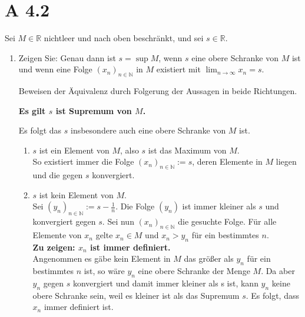 \documentclass[11pt]{article}
\begin{document}
    \section*{A 4.2}
    Sei \(M \in \mathbb{R}\) nichtleer und nach oben beschränkt, und sei \(s \in \mathbb{R}\).
    \begin{enumerate}[ label= (\alph*) ]
        \item Zeigen Sie: Genau dann ist \(s = \sup M\), wenn \(s\) eine obere Schranke von \(M\) ist
        und wenn eine Folge \({(x_n)}_{n \in \mathbb{N}}\) in \(M\) existiert mit \( \lim_{n \to \infty} x_n = s\).

        Beweisen der Äquivalenz durch Folgerung der Aussagen in beide Richtungen.
        \begin{center}
            \textbf{Es gilt \(s\) ist Supremum von \(M\).}
        \end{center}
        Es folgt das \(s\) insbesondere auch eine obere Schranke von \(M\) ist.
        \begin{enumerate}[ label = \arabic*. Fall ]
            \item \(s\) ist ein Element von \(M\), also \(s\) ist das Maximum von \(M\). \\
            So existiert immer die Folge \( {(x_n)}_{n \in \mathbb{N}} := s \), deren Elemente in \(M\) liegen und die gegen \(s\) konvergiert.

            \item \(s\) ist kein Element von \(M\). \\
            Sei \( {(y_n)}_{n \in \mathbb{N}} := s - \frac{1}{n} \). Die Folge \( (y_n) \) ist immer kleiner als \(s\) und konvergiert gegen \(s\).
            Sei nun \( {(x_n)}_{n \in \mathbb{N}} \) die gesuchte Folge. Für alle Elemente von \(x_n\) gelte \(x_n \in M \) und \(x_n > y_n\) für ein bestimmtes \(n\). \\
            \textbf{Zu zeigen: \(x_n\) ist immer definiert.} \\
            Angenommen es gäbe kein Element in \(M\) das größer als \(y_n\) für ein bestimmtes \(n\) ist, so wäre \(y_n\) eine obere Schranke der Menge \(M\).
            Da aber \(y_n\) gegen \(s\) konvergiert und damit immer kleiner als s ist, kann \(y_n\) keine obere Schranke sein, weil es kleiner ist als das Supremum \(s\).
            Es folgt, dass \(x_n\) immer definiert ist. \\
            

\end{enumerate}
\end{enumerate}
\end{document}
